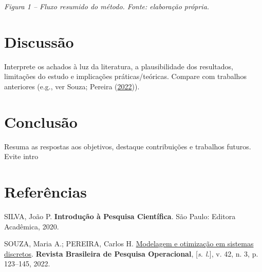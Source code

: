 \documentclass[
  12pt,
  a4paper,
]{scrartcl}
\newlength{\cslhangindent}
\newlength{\cslentryspacingunit} %
\newenvironment{CSLReferences}[2] %
 {%
  \setlength{\parindent}{0pt}
  \ifodd #1
  \let\oldpar\par
  \def\par{\hangindent=\cslhangindent\oldpar}
  \fi
  \setlength{\parskip}{#2\cslentryspacingunit}
 }%
 {}
\begin{document}
\emph{Figura 1 -- Fluxo resumido do método. Fonte: elaboração própria.}

\hypertarget{discussuxe3o}{%
\section{Discussão}\label{discussuxe3o}}

Interprete os achados à luz da literatura, a plausibilidade dos
resultados, limitações do estudo e implicações práticas/teóricas.
Compare com trabalhos anteriores (e.g., ver Souza; Pereira
(\protect\hyperlink{ref-souza2022}{2022})).

\hypertarget{conclusuxe3o}{%
\section{Conclusão}\label{conclusuxe3o}}

Resuma as respostas aos objetivos, destaque contribuições e trabalhos
futuros. Evite intro

\hypertarget{bibliography}{%
\section*{Referências}\label{bibliography}}

\hypertarget{refs}{}
\begin{CSLReferences}{0}{1}
\leavevmode{}%
SILVA, João P. \textbf{Introdução à Pesquisa Científica}. São Paulo:
Editora Acadêmica, 2020.

\leavevmode{}%
SOUZA, Maria A.; PEREIRA, Carlos H.
\href{https://doi.org/10.1234/rbpo.v42i3.2022}{Modelagem e otimização em
sistemas discretos}. \textbf{Revista Brasileira de Pesquisa
Operacional}, {[}\emph{s. l.}{]}, v. 42, n. 3, p. 123--145, 2022.

\end{CSLReferences}
\end{document}
